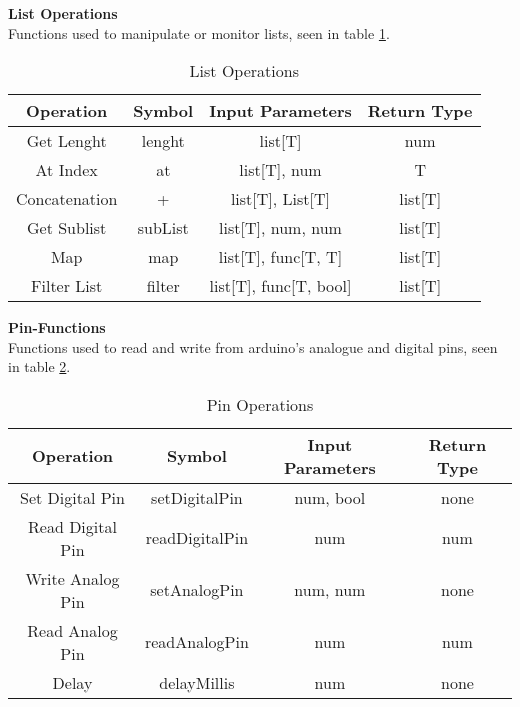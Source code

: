 \textbf{List Operations}\\
Functions used to manipulate or monitor lists, seen in table \ref{tbl:list}.
\begin{table}[h]
	\centering
	\caption{List Operations}
	\label{tbl:list}
	\begin{tabular}{|c|c|c|c|}
		\hline
		Operation     & Symbol  & Input Parameters            & Return Type \\ \hline
		Get Lenght    & lenght  & list{[}T{]}                 & num         \\ \hline
		At Index      & at      & list{[}T{]}, num            & T           \\ \hline
		Concatenation & +       & list{[}T{]}, List{[}T{]}    & list{[}T{]} \\ \hline
		Get Sublist   & subList & list{[}T{]}, num, num       & list{[}T{]} \\ \hline
		Map           & map     & list{[}T{]}, func[T, T]     & list{[}T{]} \\ \hline
		Filter List   & filter  & list{[}T{]}, func[T, bool]  & list{[}T{]} \\ \hline
	\end{tabular}
\end{table}
\newpage

\textbf{Pin-Functions}\\
Functions used to read and write from arduino's analogue and digital pins, seen in table \ref{tbl:pins}.
\begin{table}[h]
	\centering
	\caption{Pin Operations}
	\label{tbl:pins}
	\begin{tabular}{|c|c|c|c|}
		\hline
		Operation                                                      & Symbol         & Input Parameters & Return Type \\ \hline
		Set Digital Pin                                                & setDigitalPin  & num, bool        & none        \\ \hline
		Read Digital Pin                                               & readDigitalPin & num              & num         \\ \hline
		Write Analog Pin                                               & setAnalogPin   & num, num         & none        \\ \hline
		Read Analog Pin                                                & readAnalogPin  & num              & num         \\ \hline
		Delay                                                          & delayMillis    & num              & none        \\ \hline
	\end{tabular}
\end{table}

